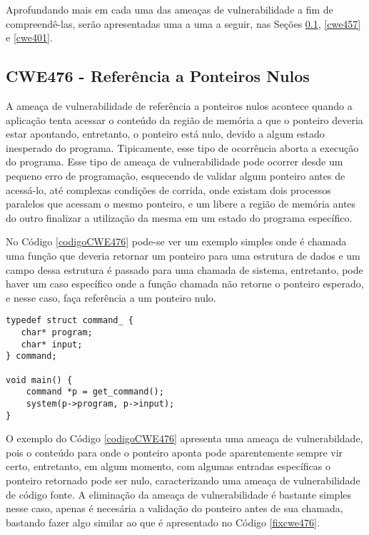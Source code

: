 Aprofundando mais em cada uma das ameaças de vulnerabilidade a fim de
compreendê-las, serão apresentadas uma a uma a seguir, nas Seções \ref{cwe476},
\ref{cwe457} e \ref{cwe401}.

\subsection{CWE476 - Referência a Ponteiros Nulos}\label{cwe476}

A ameaça de vulnerabilidade de referência a ponteiros nulos acontece quando
a aplicação tenta acessar o conteúdo da região de memória a que o ponteiro deveria estar
apontando, entretanto, o ponteiro está nulo, devido a algum estado inesperado do
programa. Tipicamente, esse tipo de ocorrência aborta a execução do programa.
Esse tipo de ameaça de vulnerabilidade pode ocorrer desde um pequeno erro de
programação, esquecendo de validar algum ponteiro antes de acessá-lo, até
complexas condições de corrida, onde existam dois processos paralelos que acessam o mesmo
ponteiro, e um libere a região de memória antes do outro finalizar a utilização
da mesma em um estado do programa específico. 

No Código \ref{codigoCWE476} pode-se ver um exemplo simples onde é chamada uma
função que deveria retornar um ponteiro para uma estrutura de dados e um campo
dessa estrutura é passado para uma chamada de sistema, entretanto, pode haver um
caso específico onde a função chamada não retorne o ponteiro esperado, e nesse
caso, faça referência a um ponteiro nulo.

\begin{lstlisting}[caption={Código exemplo CWE476}, label=codigoCWE476]
typedef struct command_ {
   char* program;
   char* input;
} command;

void main() {
    command *p = get_command();
    system(p->program, p->input);
} 
\end{lstlisting}

O exemplo do Código \ref{codigoCWE476} apresenta uma ameaça de vulnerabildade, pois o
conteúdo para onde o ponteiro aponta pode aparentemente sempre vir certo,
entretanto, em algum momento, com algumas entradas específicas o ponteiro
retornado pode ser nulo, caracterizando uma ameaça de vulnerabilidade de código
fonte. A eliminação da ameaça de vulnerabilidade é bastante simples nesse caso,
apenas é necesária a validação do ponteiro antes de sua chamada, bastando fazer
algo similar ao que é apresentado no Código \ref{fixcwe476}.

